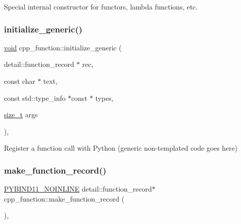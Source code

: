 Special internal constructor for functors, lambda functions, etc. 

\mbox{\label{classcpp__function_a4120dff5c867829edb5ad1df929ec522}} 
\subsubsection{\texorpdfstring{initialize\_generic()}{initialize\_generic()}}
{\footnotesize\ttfamily \mbox{\hyperlink{_s_d_l__opengles2__gl2ext_8h_ae5d8fa23ad07c48bb609509eae494c95}{void}} cpp\+\_\+function\+::initialize\+\_\+generic (\begin{DoxyParamCaption}\item[{detail\+::function\+\_\+record $\ast$}]{rec,  }\item[{const char $\ast$}]{text,  }\item[{const std\+::type\+\_\+info $\ast$const $\ast$}]{types,  }\item[{\mbox{\hyperlink{detail_2common_8h_a801d6a451a01953ef8cbae6feb6a3638}{size\+\_\+t}}}]{args }\end{DoxyParamCaption})\hspace{0.3cm}{\ttfamily [inline]}, {\ttfamily [protected]}}



Register a function call with Python (generic non-\/templated code goes here) 

\mbox{\label{classcpp__function_a7d2049a6916365d7d7de982d574e2f3c}} 
\subsubsection{\texorpdfstring{make\_function\_record()}{make\_function\_record()}}
{\footnotesize\ttfamily \mbox{\hyperlink{detail_2common_8h_a1fb186b7494d5c576d902c0730ecbb71}{P\+Y\+B\+I\+N\+D11\+\_\+\+N\+O\+I\+N\+L\+I\+NE}} detail\+::function\+\_\+record$\ast$ cpp\+\_\+function\+::make\+\_\+function\+\_\+record (\begin{DoxyParamCaption}{ }\end{DoxyParamCaption})\hspace{0.3cm}{\ttfamily [inline]}, {\ttfamily [protected]}}



